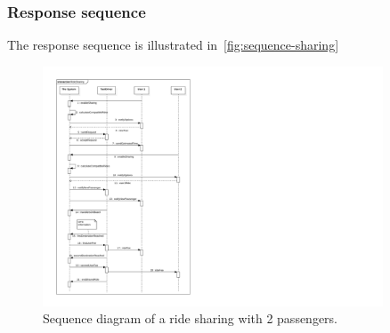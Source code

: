 \subsubsection{Response sequence}
The response sequence is illustrated in~\autoref{fig:sequence-sharing}

\begin{figure}
	\begin{center}
	\includegraphics[width=0.9\textwidth]{diagrams/sequence_ride_sharing.pdf}
	\caption{Sequence diagram of a ride sharing with 2 passengers.}
	\label{fig:sequence-sharing}
	\end{center}
\end{figure}

